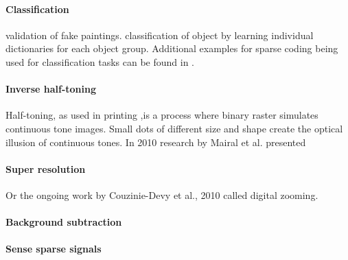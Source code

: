 \paragraph{Classification} \cite{?} validation of fake paintings. 
\cite{?} classification of object by learning  individual dictionaries for each
object group. Additional examples for sparse coding  being used for
classification tasks can be found in
\cite{Raina2007,BradleyBagnel2009,Mairal2008,Mairal2008b,Bar2009,Yang2009}.

\paragraph{Inverse half-toning} Half-toning, as used in printing ,is a process
where binary raster simulates continuous tone images. Small dots of different
size and shape create the optical illusion of continuous tones. In 2010 research
by Mairal et al.\cite{Mairal2010b} presented 

\paragraph{Super resolution} \cite{Wright2008,Yang2010}  
Or the ongoing work by Couzinie-Devy et al., 2010 called digital zooming.

\paragraph{Background subtraction}\cite{}

\paragraph{Sense sparse signals}\cite{Duarte2009}






